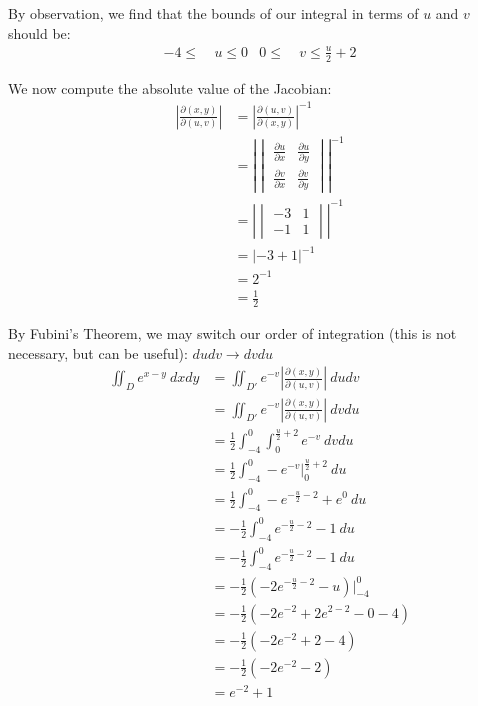 \begin{solution}
    By observation, we find that the bounds of our integral in terms of \(u\) and \(v\) should be:
    \begin{align}
        -4 \leq & \ u \leq 0 & 0 \leq & \ v \leq \frac{u}{2} + 2
    \end{align}
    
    We now compute the absolute value of the Jacobian:
    \begin{align*}
        \left|\frac{\partial(x, y)}{\partial(u, v)}\right| &= \left|\frac{\partial(u, v)}{\partial(x, y) }\right|^{-1} \\
        &= \left|\begin{vmatrix}
            \frac{\partial u}{\partial x} & \frac{\partial u}{\partial y} \\
            \frac{\partial v}{\partial x} & \frac{\partial v}{\partial y}
        \end{vmatrix}\right|^{-1} \\
        &= \left|\begin{vmatrix}
            -3 & 1 \\
            -1 & 1
        \end{vmatrix}\right|^{-1} \\
        &= \left|-3 + 1\right|^{-1} \\
        &= 2^{-1} \\
        &= \frac{1}{2}
    \end{align*}
    
    By Fubini's Theorem, we may switch our order of integration (this is not necessary, but can be useful): \(dudv \rightarrow dvdu\)
    \begin{align*}
        \iint_D e^{x - y} \ dxdy &= \iint_{D'} e^{-v} \left|\frac{\partial(x, y)}{\partial(u, v) }\right| \ dudv \\
        &= \iint_{D'} e^{-v} \left|\frac{\partial(x, y)}{\partial(u, v) }\right| \ dvdu \\
        &= \frac{1}{2} \int_{-4}^{0} \int_{0}^{\frac{u}{2}+2} e^{-v} \ dvdu \\
        &= \frac{1}{2} \int_{-4}^{0} -e^{-v} \Big|_{0}^{\frac{u}{2}+2} \ du \\
        &= \frac{1}{2} \int_{-4}^{0} -e^{-\frac{u}{2} - 2} + e^0 \ du \\
        &= -\frac{1}{2} \int_{-4}^{0} e^{-\frac{u}{2} - 2} - 1 \ du \\
        &= -\frac{1}{2} \int_{-4}^{0} e^{-\frac{u}{2} - 2} - 1 \ du \\
        &= -\frac{1}{2} \left( -2e^{-\frac{u}{2} - 2} - u\right)\Big|_{-4}^{0} \\
        &= -\frac{1}{2} \left( -2e^{- 2} + 2e^{2 - 2} - 0 -4\right) \\
        &= -\frac{1}{2} \left( -2e^{- 2} + 2 -4\right) \\
        &= -\frac{1}{2} \left( -2e^{- 2} - 2\right) \\
        &= e^{-2} + 1
    \end{align*}
\end{solution}

